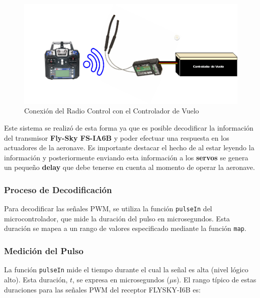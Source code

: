         \begin{figure}[H]
            \centering
            \includegraphics[width=6 in]{Imagenes/Metodologia/Radio Control.drawio.png}
            \caption{Conexión del Radio Control con el Controlador de Vuelo}
            \label{fig:radio_arqui}
        \end{figure}

        Este sistema se realizó de esta forma ya que es posible decodificar la información del transmisor  \textbf{Fly-Sky FS-IA6B} y poder efectuar una respuesta en los actuadores de la aeronave. Es importante destacar el hecho de al estar leyendo la información y posteriormente  enviando esta información a los \textbf{servos} se genera un pequeño \textbf{delay} que debe tenerse en cuenta al momento de operar la aeronave.

        \vspace{5 px}
        \subsubsection{Proceso de Decodificación}
 
            Para decodificar las señales PWM, se utiliza la función \texttt{pulseIn} del microcontrolador, que mide la duración del pulso en microsegundos. Esta duración se mapea a un rango de valores especificado mediante la función \texttt{map}.
            \vspace{5 px}
        \subsubsection{Medición del Pulso}
    
            La función \texttt{pulseIn} mide el tiempo durante el cual la señal es alta (nivel lógico alto). Esta duración, \( t \), se expresa en microsegundos (\(\mu\)s). El rango típico de estas duraciones para las señales PWM del receptor FLYSKY-I6B es:


